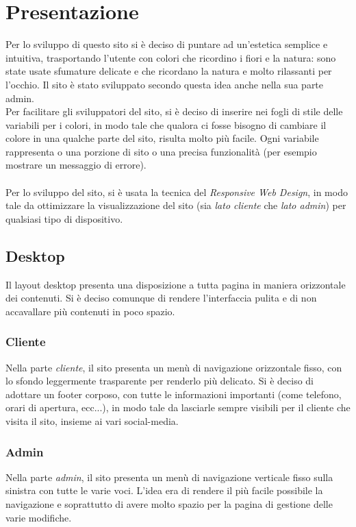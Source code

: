\section{Presentazione}
Per lo sviluppo di questo sito si è deciso di puntare ad un'estetica semplice e intuitiva, trasportando l'utente con colori che ricordino i fiori e la natura: sono state usate sfumature delicate e che ricordano la natura e molto rilassanti per l'occhio. Il sito è stato sviluppato secondo questa idea anche nella sua parte admin.\\Per facilitare gli sviluppatori del sito, si è deciso di inserire nei fogli di stile delle variabili per i colori, in modo tale che qualora ci fosse bisogno di cambiare il colore in una qualche parte del sito, risulta molto più facile. Ogni variabile rappresenta o una porzione di sito o una precisa funzionalità (per esempio mostrare un messaggio di errore).\\\\Per lo sviluppo del sito, si è usata la tecnica del \textit{Responsive Web Design}, in modo tale da ottimizzare la visualizzazione del sito (sia \textit{lato cliente} che \textit{lato admin}) per qualsiasi tipo di dispositivo. 

\subsection{Desktop}
Il layout desktop presenta una disposizione a tutta pagina in maniera orizzontale dei contenuti. Si è deciso comunque di rendere l'interfaccia pulita e di non accavallare più contenuti in poco spazio. 
\subsubsection{Cliente}
Nella parte \textit{cliente}, il sito presenta un menù di navigazione orizzontale fisso, con lo sfondo leggermente trasparente per renderlo più delicato.
Si è deciso di adottare un footer corposo, con tutte le informazioni importanti (come telefono, orari di apertura, ecc...), in modo tale da lasciarle sempre visibili per il cliente che visita il sito, insieme ai vari social-media.
\subsubsection{Admin}
Nella parte \textit{admin}, il sito presenta un menù di navigazione verticale fisso sulla sinistra con tutte le varie voci. L'idea era di rendere il più facile possibile la navigazione e soprattutto di avere molto spazio per la pagina di gestione delle varie modifiche.
